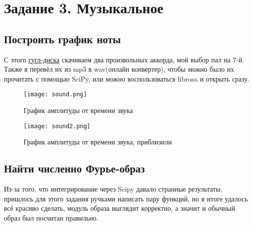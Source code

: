 \chapter{Задание 3. Музыкальное}
\label{ch:chap4}



\lstset{style=mystyle}

\section{Построить график ноты}

С этого \href{https://drive.google.com/drive/folders/14lwzvV84uXtyuXXspoYUSf-VdR52t0sE}{гугл-диска} скачиваем два произвольных аккорда,
мой выбор пал на 7-й. Также я перевёл их из mp3 в wav(онлайн конвертер), чтобы можно было их прочитать с помощью SciPy, или можно воспользоваться librosa и открыть сразу.

\begin{figure}[ht]
    \centering
    \texttt{[image: sound.png]}
    \caption{График амплитуды от времени звука}
\end{figure}

\begin{figure}[ht]
    \centering
    \texttt{[image: sound2.png]}
    \caption{График амплитуды от времени звука, приблизили}
\end{figure}

\section{Найти численно Фурье-образ}

Из-за того, что интегрирование через Scipy давало странные результаты, пришлось для этого задания ручками написать пару функций, но в итоге удалось всё красиво сделать, модуль образа выглядит корректно, а значит и обычный образ был посчитан правильно.

